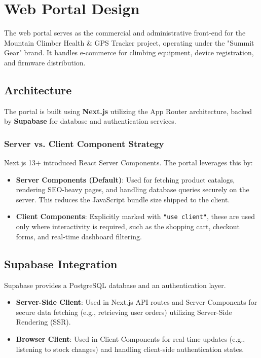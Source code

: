 \chapter{Web Portal Design}
\label{ch:portal_design}

The web portal serves as the commercial and administrative front-end for the Mountain Climber Health \& GPS Tracker project, operating under the "Summit Gear" brand. It handles e-commerce for climbing equipment, device registration, and firmware distribution.

\section{Architecture}

The portal is built using \textbf{Next.js} utilizing the App Router architecture, backed by \textbf{Supabase} for database and authentication services.

\subsection{Server vs. Client Component Strategy}
Next.js 13+ introduced React Server Components. The portal leverages this by:
\begin{itemize}
    \item \textbf{Server Components (Default)}: Used for fetching product catalogs, rendering SEO-heavy pages, and handling database queries securely on the server. This reduces the JavaScript bundle size shipped to the client.
    \item \textbf{Client Components}: Explicitly marked with \texttt{"use client"}, these are used only where interactivity is required, such as the shopping cart, checkout forms, and real-time dashboard filtering.
\end{itemize}

\section{Supabase Integration}

Supabase provides a PostgreSQL database and an authentication layer.
\begin{itemize}
    \item \textbf{Server-Side Client}: Used in Next.js API routes and Server Components for secure data fetching (e.g., retrieving user orders) utilizing Server-Side Rendering (SSR).
    \item \textbf{Browser Client}: Used in Client Components for real-time updates (e.g., listening to stock changes) and handling client-side authentication states.
\end{itemize}

